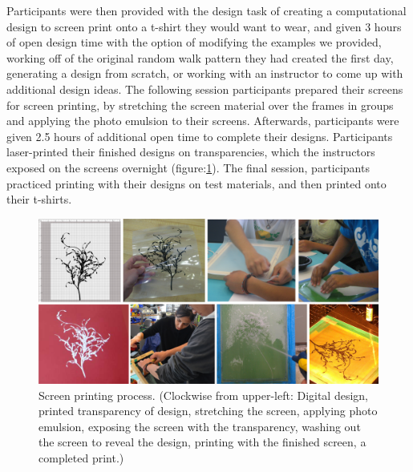 \documentclass{sigchi}
\begin{document}
Participants were then provided with the design task of creating a computational design to screen print onto a t-shirt they would want to wear, and given 3 hours of open design time with the option of modifying the examples we provided, working off of the original random walk pattern they had created the first day, generating a design from scratch, or working with an instructor to come up with additional design ideas. The following session participants prepared their screens for screen printing, by stretching the screen material over the frames in groups and applying the photo emulsion to their screens. Afterwards, participants were given 2.5 hours of additional open time to complete their designs. Participants laser-printed their finished designs on transparencies, which the instructors exposed on the screens overnight (figure:\ref{fig:screen_printing_process}). The final session, participants practiced printing with their designs on test materials, and then printed onto their t-shirts.
\begin{center}
\begin{figure}[h!]
\includegraphics[width=\columnwidth]{images/screen_printing_process.png}
\caption{Screen printing process. (Clockwise from upper-left: Digital design, printed transparency of design, stretching the screen, applying photo emulsion, exposing the screen with the transparency, washing out the screen to reveal the design, printing with the finished screen, a completed print.) }
\label{fig:screen_printing_process}
\end{figure}
\end{center}
\end{document}
